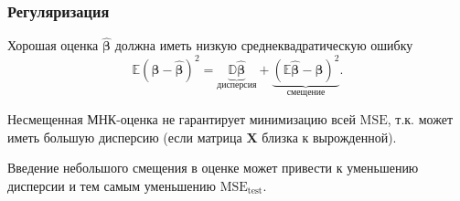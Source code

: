 \documentclass[ucs, notheorems, handout]{beamer}
\newcommand{\betah}{\hat{\bm \beta}}
\newcommand{\betaa}{\bm{\beta}}
\begin{document}
\begin{frame}
	\frametitle{Регуляризация}
	Хорошая оценка $\betah$ должна иметь низкую среднеквадратическую ошибку 
	\begin{equation*}
		\label{eq:mse}
		\mathbb{E}(\betaa - \betah)^2 = \underbrace{\mathbb D \betah}_{\text{дисперсия}} + \underbrace{(\mathbb E \betah - \betaa)^2}_{\text{смещение}}.
	\end{equation*}

	Несмещенная МНК-оценка не гарантирует минимизацию всей $\mathrm{MSE}$,
	т.к. может иметь большую дисперсию (если матрица $\bm X$ близка к вырожденной).
	
	
	Введение небольшого смещения в оценке может привести к уменьшению дисперсии и тем самым уменьшению $\mathrm{MSE}_{\text{test}}$.

	
\end{frame}
\end{document}
